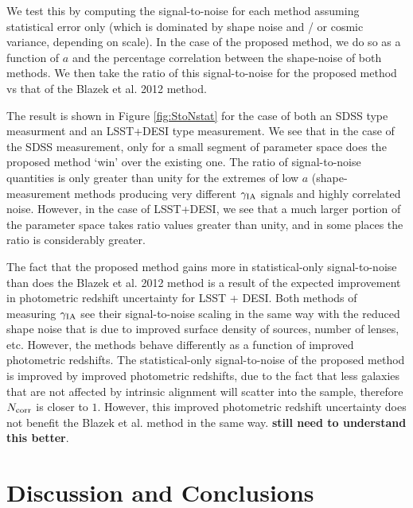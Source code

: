 \documentclass[a4paper,fleqn,usenatbib,useAMS]{mnras}
\begin{document}
We test this by computing the signal-to-noise for each method assuming statistical error only (which is dominated by shape noise and / or cosmic variance, depending on scale). In the case of the proposed method, we do so as a function of $a$ and the percentage correlation between the shape-noise of both methods. We then take the ratio of this signal-to-noise for the proposed method vs that of the Blazek et al. 2012 method.

The result is shown in Figure \ref{fig:StoNstat} for the case of both an SDSS type measurment and an LSST+DESI type measurement. We see that in the case of the SDSS measurement, only for a small segment of parameter space does the proposed method `win' over the existing one. The ratio of signal-to-noise quantities is only greater than unity for the extremes of low $a$ (shape-measurement methods producing very different $\gamma_{\rm IA}$ signals and highly correlated noise. However, in the case of LSST+DESI, we see that a much larger portion of the parameter space takes ratio values greater than unity, and in some places the ratio is considerably greater.

The fact that the proposed method gains more in statistical-only signal-to-noise than does the Blazek et al. 2012 method is a result of the expected improvement in photometric redshift uncertainty for LSST + DESI. Both methods of measuring $\gamma_{\rm IA}$ see their signal-to-noise scaling in the same way with the reduced shape noise that is due to improved surface density of sources, number of lenses, etc. However, the methods behave differently as a function of improved photometric redshifts. The statistical-only signal-to-noise of the proposed method is improved by improved photometric redshifts, due to the fact that less galaxies that are not affected by intrinsic alignment will scatter into the sample, therefore $N_{\rm corr}$ is closer to $1$. However, this improved photometric redshift uncertainty does not benefit the Blazek et al. method in the same way. {\bf still need to understand this better}.

\begin{figure*}
\centering
{}
\caption{Ratio of statistical-only signal-to-noise for the proposed method vs the method of \cite{Blazek2012}. Left: SDSS. Right: LSST+DESI.}
\label{fig:StoNstat}
\end{figure*}

\section{Discussion and Conclusions}
\label{sec:conclusions}



\end{document}
